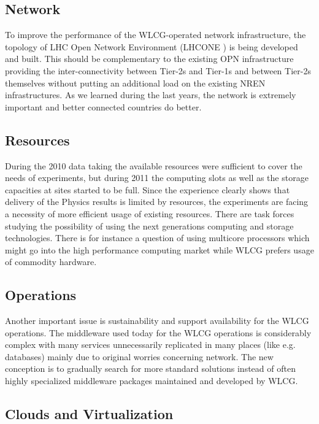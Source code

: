 \subsection{Network}
%
To improve the performance of the WLCG-operated network
infrastructure, the topology of LHC Open Network Environment (LHCONE
\cite{LHCONE}) is being developed and built. This should be complementary to
the existing OPN infrastructure providing the inter-connectivity
between Tier-2s and Tier-1s and between Tier-2s themselves without
putting an additional load on the existing NREN infrastructures. As
we learned during the last years, the network is extremely important
and better connected countries do better.


\subsection{Resources}

During the 2010 data taking the available resources
were sufficient to cover the needs of experiments, but during 2011
the computing slots as well as the storage capacities at sites
started to be full. Since the experience clearly shows that delivery
of the Physics results is limited by resources, the experiments are
facing a necessity of more efficient usage of existing resources.
There are task forces studying the possibility of using the next
generations computing and storage technologies. There is for
instance a question of using multicore processors which might go
into the high performance computing market while WLCG prefers usage
of commodity hardware.


\subsection{Operations}

Another important issue is sustainability and support
availability for the WLCG operations. The middleware used today for
the WLCG operations is considerably complex with many services
unnecessarily replicated in many places (like e.g. databases) mainly
due to original worries concerning network. The new conception is to
gradually search for more standard solutions instead of often highly
specialized middleware packages maintained and developed by WLCG.


\subsection{Clouds and Virtualization}

